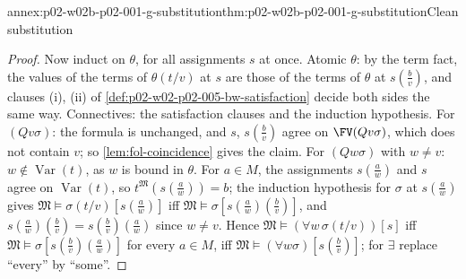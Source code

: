 \begin{annexitem}{annex:p02-w02b-p02-001-g-substitution}{thm:p02-w02b-p02-001-g-substitution}{Clean substitution}
\begin{proof}
Now induct on \(\theta\), for all assignments \(s\) at once.  Atomic
\(\theta\): by the term fact, the values of the terms of \(\theta(t/v)\)
at \(s\) are those of the terms of \(\theta\) at \(s(\tfrac bv)\), and
clauses (i), (ii) of \cref{def:p02-w02-p02-005-bw-satisfaction} decide
both sides the same way.  Connectives: the satisfaction clauses and the
induction hypothesis.  For \((Qv\sigma)\): the formula is unchanged, and
\(s\), \(s(\tfrac bv)\) agree on \(\FV(Qv\sigma)\), which does not contain
\(v\); so \cref{lem:fol-coincidence} gives the claim.  For \((Qw\sigma)\)
with \(w\neq v\): \(w\notin\operatorname{Var}(t)\), as \(w\) is bound in
\(\theta\).  For \(a\in M\), the assignments \(s(\tfrac aw)\) and \(s\)
agree on \(\operatorname{Var}(t)\), so \(t^{\mathfrak M}(s(\tfrac aw))=b\);
the induction hypothesis for \(\sigma\) at \(s(\tfrac aw)\) gives
\(\mathfrak M\models\sigma(t/v)[s(\tfrac aw)]\) iff
\(\mathfrak M\models\sigma[s(\tfrac aw)(\tfrac bv)]\), and
\(s(\tfrac aw)(\tfrac bv)=s(\tfrac bv)(\tfrac aw)\) since \(w\neq v\).
Hence \(\mathfrak M\models(\forall w\,\sigma(t/v))[s]\) iff
\(\mathfrak M\models\sigma[s(\tfrac bv)(\tfrac aw)]\) for every \(a\in M\),
iff \(\mathfrak M\models(\forall w\sigma)[s(\tfrac bv)]\); for \(\exists\)
replace ``every'' by ``some''.
\end{proof}
\end{annexitem}

